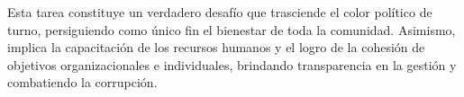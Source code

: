 \documentclass[
  letterpaper,
  DIV=11,
  numbers=noendperiod]{scrartcl}
\begin{document}
Esta tarea constituye un verdadero desafío que trasciende el color
político de turno, persiguiendo como único fin el bienestar de toda la
comunidad. Asimismo, implica la capacitación de los recursos humanos y
el logro de la cohesión de objetivos organizacionales e individuales,
brindando transparencia en la gestión y combatiendo la corrupción.


\printbibliography
\end{document}
